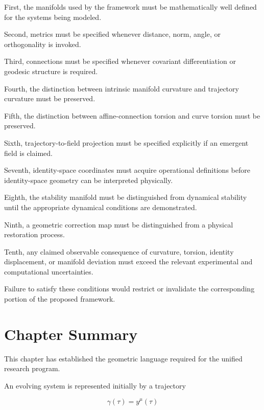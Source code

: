 \documentclass[12pt,oneside]{book}
\begin{document}
First, the manifolds used by the framework must be mathematically
well defined for the systems being modeled.

Second, metrics must be specified whenever distance, norm, angle,
or orthogonality is invoked.

Third, connections must be specified whenever covariant
differentiation or geodesic structure is required.

Fourth, the distinction between intrinsic manifold curvature and
trajectory curvature must be preserved.

Fifth, the distinction between affine-connection torsion and
curve torsion must be preserved.

Sixth, trajectory-to-field projection must be specified
explicitly if an emergent field is claimed.

Seventh, identity-space coordinates must acquire operational
definitions before identity-space geometry can be interpreted
physically.

Eighth, the stability manifold must be distinguished from
dynamical stability until the appropriate dynamical conditions
are demonstrated.

Ninth, a geometric correction map must be distinguished from a
physical restoration process.

Tenth, any claimed observable consequence of curvature,
torsion, identity displacement, or manifold deviation must
exceed the relevant experimental and computational
uncertainties.

Failure to satisfy these conditions would restrict or invalidate
the corresponding portion of the proposed framework.


\section{Chapter Summary}
\label{sec:geometry-chapter-summary}

This chapter has established the geometric language required for
the unified research program.

An evolving system is represented initially by a trajectory

\begin{equation}
    \gamma(\tau)
    =
    y^\mu(\tau)
\end{equation}
\end{document}
